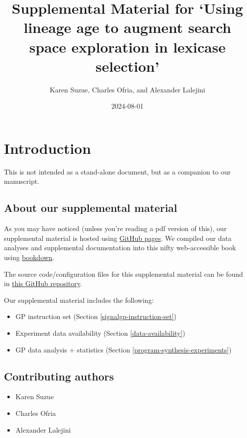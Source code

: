 \documentclass[
]{book}
\title{Supplemental Material for `Using lineage age to augment search space exploration in lexicase selection'}
\author{Karen Suzue, Charles Ofria, and Alexander Lalejini}
\date{2024-08-01}
\providecommand{\tightlist}{%
  \setlength{\itemsep}{0pt}\setlength{\parskip}{0pt}}
\begin{document}
\maketitle

{
\setcounter{tocdepth}{1}
\tableofcontents
}
\hypertarget{introduction}{%
\chapter{Introduction}\label{introduction}}

This is not intended as a stand-alone document, but as a companion to our manuscript.

\hypertarget{about-our-supplemental-material}{%
\section{About our supplemental material}\label{about-our-supplemental-material}}

As you may have noticed (unless you're reading a pdf version of this), our supplemental material is hosted using \href{https://pages.github.com/}{GitHub pages}.
We compiled our data analyses and supplemental documentation into this nifty web-accessible book using \href{https://bookdown.org}{bookdown}.

The source code/configuration files for this supplemental material can be found in \href{https://github.com/amlalejini/age-based-lex}{this GitHub repository}.

Our supplemental material includes the following:

\begin{itemize}
\tightlist
\item
  GP instruction set (Section \ref{signalgp-instruction-set})
\item
  Experiment data availability (Section \ref{data-availability})
\item
  GP data analysis + statistics (Section \ref{program-synthesis-experiments})
\end{itemize}

\hypertarget{contributing-authors}{%
\section{Contributing authors}\label{contributing-authors}}

\begin{itemize}
\tightlist
\item
  Karen Suzue
\item
  Charles Ofria
\item
  Alexander Lalejini
\end{itemize}
\end{document}
